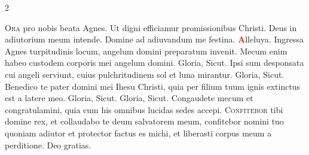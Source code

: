 \begin{multicols}{2}
\begin{responsory-doxology}
\end{responsory-doxology}%
\newline {}
\lettrine[lines=2]{\zallmancaps \color{Red} O}{ra} pro nobis beata Agnes. \R Ut digni efficiamur promissionibus Christi. \V Deus in adiutorium meum intende. \R Domine ad adiuvandum me festina. 
\newline \doxology \textcolor{Red}{\bfseries A}lleluya.
\newline {} Ingressa Agnes turpitudinis locum, angelum domini preparatum invenit.
\newline {} Mecum enim habeo custodem corporis mei angelum domini.
\newline {} Gloria,  Sicut.
\newline {} Ipsi sum desponsata cui angeli serviunt, cuius pulchritudinem sol et luna mirantur.
\newline {} Gloria,  Sicut.
\newline {} Benedico te pater domini mei Ihesu Christi, quia per filium tuum ignis extinctus est a latere meo.
\newline {} Gloria,  Sicut.
\newline {} Gloria,  Sicut.
\newline {} Congaudete mecum et congratulamini, quia cum his omnibus lucidas sedes accepi.
\newline {}
\lettrine[lines=2]{\zallmancaps \color{Blue} C}{onfitebor} tibi domine rex, et collaudabo te deum salvatorem meum, confitebor nomini tuo quoniam adiutor et protector factus es michi, et liberasti corpus meum a perditione. \R Deo gratias.
\newline {}
\end{multicols}
